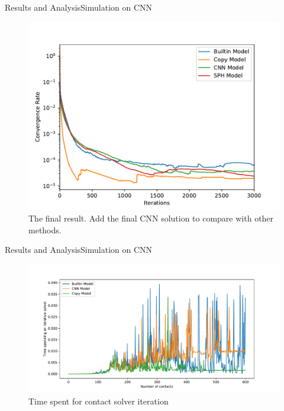 \documentclass{beamer}
\begin{document}
\begin{frame}{Results and Analysis}{Simulation on CNN}
\begin{figure}[!h]
    \centering
    \includegraphics[scale = 0.4]{../report/Figures/cnn.pdf}
    \caption{The final result. Add the final CNN solution to compare with other methods.}
    \label{testoneworld}
\end{figure}
\end{frame}
\begin{frame}{Results and Analysis}{Simulation on CNN}
\begin{figure}[!h]
        \centering
            \includegraphics[scale = 0.4]{../report/Figures/cnntime}
            \caption{Time spent for contact solver iteration}
\end{figure}
\end{frame}
\end{document}
